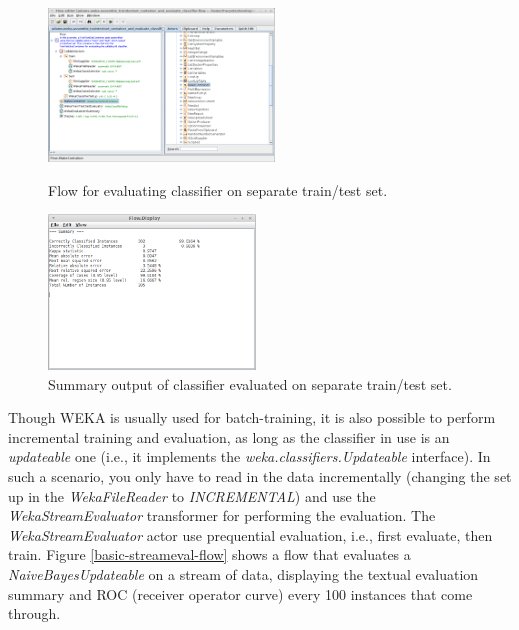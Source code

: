 \begin{figure}[ht]
  \begin{minipage}[t]{0.5\linewidth}
    \centering
    \includegraphics[width=6.0cm]{images/basic-traintestseteval-flow.png}
    \caption{Flow for evaluating classifier on separate train/test set.}
    \label{basic-traintestseteval-flow}
  \end{minipage}
  \hspace{0.5cm}
  \begin{minipage}[t]{0.5\linewidth}
    \centering
    \includegraphics[width=5.5cm]{images/basic-traintestseteval-output.png}
    \caption{Summary output of classifier evaluated on separate train/test set.}
    \label{basic-traintestseteval-output}
  \end{minipage}
\end{figure}

Though WEKA is usually used for batch-training, it is also possible to perform
incremental training and evaluation, as long as the classifier in use is an
\textit{updateable} one (i.e., it implements the \textit{weka.classifiers.Updateable}
interface). In such a scenario, you only have to read in the data incrementally
(changing the set up in the \textit{WekaFileReader} to \textit{INCREMENTAL})
and use the \textit{WekaStreamEvaluator} transformer for performing the
evaluation. The \textit{WekaStreamEvaluator} actor use prequential evaluation,
i.e., first evaluate, then train. Figure \ref{basic-streameval-flow} shows a 
flow that evaluates a \textit{NaiveBayesUpdateable} on a stream of data, 
displaying the textual evaluation summary and ROC (receiver operator curve) 
every 100 instances that come through.

